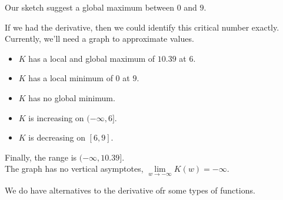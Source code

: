 \documentclass{ximera}
\begin{document}
\begin{example}
\begin{image}
\end{image}


Our sketch suggest a global maximum between $0$ and $9$.


If we had the derivative, then we could identify this critical number exactly. Currently, we'll need a graph to approximate values.




\begin{center}
\end{center}





\begin{itemize}
\item $K$ has a local and global maximum of $10.39$ at $6$.
\item $K$ has a local minimum of $0$ at $9$.
\item $K$ has no global minimum.
\end{itemize}




\begin{itemize}
\item $K$ is increasing on $(-\infty, 6]$.
\item $K$ is decreasing on $[6, 9]$.
\end{itemize}


Finally, the range is $(-\infty, 10.39]$. \\


The graph has no vertical asymptotes, $\lim\limits_{w \to -\infty} K(w) = -\infty.$


\end{example}



We do have alternatives to the derivative ofr some types of functions. \\
\end{document}
